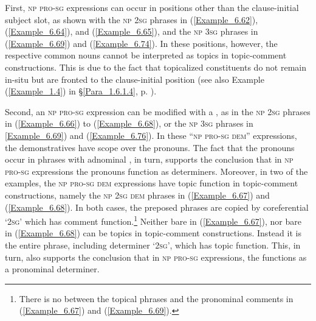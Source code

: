 First, \textsc{np} \textsc{pro-sg} expressions can occur in positions other than the clause-initial subject slot, as shown with the \textsc{np} \textsc{2sg}  phrases in (\ref{Example_6.62}), (\ref{Example_6.64}), and (\ref{Example_6.65}), and the \textsc{np} \textsc{3sg}  phrases in (\ref{Example_6.69}) and (\ref{Example_6.74}). In these positions, however, the respective common nouns cannot be interpreted as topics in topic-comment constructions. This is due to the fact that topicalized constituents do not remain in-situ but are fronted to the clause-initial position (see also Example (\ref{Example_1.4}) in §\ref{Para_1.6.1.4}, p. \pageref{Example_1.4}).



Second, an \textsc{np} \textsc{pro-sg} expression can be modified with a , as in the \textsc{np} \textsc{2sg}  phrases in (\ref{Example_6.66}) to (\ref{Example_6.68}), or the \textsc{np} \textsc{3sg}  phrases in \ref{Example_6.69}) and (\ref{Example_6.76}). In these ``\textsc{np} \textsc{pro-sg dem}'' expressions, the demonstratives have scope over the pronouns. The fact that the pronouns occur in  phrases with adnominal , in turn, supports the conclusion that in \textsc{np} \textsc{pro-sg} expressions the pronouns function as determiners. Moreover, in two of the examples, the \textsc{np} \textsc{pro-sg} \textsc{dem} expressions have topic function in topic-comment constructions, namely the \textsc{np} \textsc{2sg} \textsc{dem}  phrases in (\ref{Example_6.67}) and (\ref{Example_6.68}). In both cases, the preposed  phrases are copied by coreferential  ‘\textsc{2sg}’ which has comment function.\footnote{There is no  between the topical  phrases and the pronominal comments in (\ref{Example_6.67}) and (\ref{Example_6.69}).} Neither bare  in (\ref{Example_6.67}), nor bare  in (\ref{Example_6.68}) can be topics in topic-comment constructions. Instead it is the entire  phrase, including determiner  ‘2\textsc{sg}’, which has topic function. This, in turn, also supports the conclusion that in \textsc{np} \textsc{pro-sg} expressions, the  functions as a pronominal determiner.



